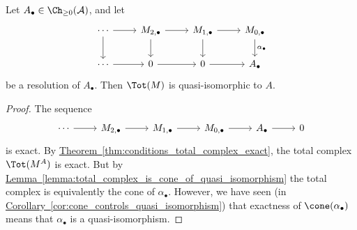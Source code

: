 \documentclass[main.tex]{subfiles}
\begin{document}
\begin{theorem}
  \label{thm:resolutions_in_double_complexes_are_resolutions_of_total_complex}
  Let $A_{\bullet} \in \Ch_{\geq 0}(\mathcal{A})$, and let
  \begin{equation*}
    \begin{tikzcd}
      \cdots
      \arrow[r]
      \arrow[d]
      & M_{2, \bullet}
      \arrow[r]
      \arrow[d]
      & M_{1, \bullet}
      \arrow[r]
      \arrow[d]
      & M_{0, \bullet}
      \arrow[d, "\alpha_{\bullet}"]
      \\
      \cdots
      \arrow[r]
      & 0
      \arrow[r]
      & 0
      \arrow[r]
      & A_{\bullet}
    \end{tikzcd}
  \end{equation*}
  be a resolution of $A_{\bullet}$. Then $\Tot(M)$ is quasi-isomorphic to $A$.
\end{theorem}
\begin{proof}
  The sequence
  \begin{equation*}
    \begin{tikzcd}
      \cdots
      \arrow[r]
      & M_{2,\bullet}
      \arrow[r]
      & M_{1,\bullet}
      \arrow[r]
      & M_{0,\bullet}
      \arrow[r]
      & A_{\bullet}
      \arrow[r]
      & 0
    \end{tikzcd}
  \end{equation*}
  is exact. By \hyperref[thm:conditions_total_complex_exact]{Theorem~\ref*{thm:conditions_total_complex_exact}}, the total complex $\Tot(M^{A})$ is exact. But by \hyperref[lemma:total_complex_is_cone_of_quasi_isomorphism]{Lemma~\ref*{lemma:total_complex_is_cone_of_quasi_isomorphism}} the total complex is equivalently the cone of $\alpha_{\bullet}$. However, we have seen (in \hyperref[cor:cone_controls_quasi_isomorphism]{Corollary~\ref*{cor:cone_controls_quasi_isomorphism}}) that exactness of $\cone(\alpha_{\bullet})$ means that $\alpha_{\bullet}$ is a quasi-isomorphism.
\end{proof}
\end{document}
